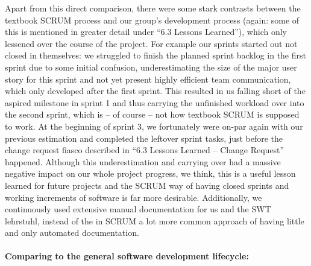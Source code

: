 Apart from this direct comparison, there were some stark contrasts between the textbook SCRUM process and our group’s development process (again: some of this is mentioned in greater detail under “6.3 Lessons Learned”), which only lessened over the course of the project. For example our sprints started out not closed in themselves: we struggled to finish the planned sprint backlog in the first sprint due to some initial confusion, underestimating the size of the major user story for this sprint and not yet present highly efficient team communication, which only developed after the first sprint. This resulted in us falling short of the aspired milestone in sprint 1 and thus carrying the unfinished workload over into the second sprint, which is – of course – not how textbook SCRUM is supposed to work. At the beginning of sprint 3, we fortunately were on-par again with our previous estimation and completed the leftover sprint tasks, just before the change request fiasco described in “6.3 Lessons Learned – Change Request” happened. Although this underestimation and carrying over had a massive negative impact on our whole project progress, we think, this is a useful lesson learned for future projects and the SCRUM way of having closed sprints and working increments of software is far more desirable. Additionally, we continuously used extensive manual documentation for us and the SWT lehrstuhl, instead of the in SCRUM a lot more common approach of having little and only automated documentation.\\
\ \\
{\large\textbf{Comparing to the general software development lifecycle:}}\\ 
\ \\
